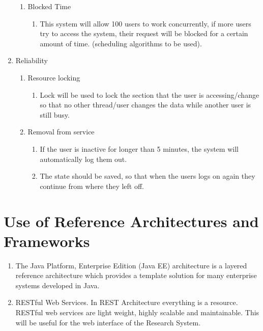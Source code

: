 \documentclass[hidelinks,a4paper,12pt]{article}
\begin{document}
\begin{enumerate}
\begin{enumerate}
		\item  Blocked Time
		\begin{enumerate}
			\item   This system will allow 100 users to work concurrently, if more users try to access the system, their request will be blocked for a certain amount of time.             (scheduling algorithms to be used).
		\end{enumerate}
	\end{enumerate}
	
	
	
	\item  Reliability
		\begin{enumerate}
			\item  Resource locking
				\begin{enumerate}
					\item  Lock will be used to lock the section that the user is accessing/change so that no other thread/user changes the data while another user is still busy.
				\end{enumerate}
			
			\item Removal from service
							\begin{enumerate}
								\item   If the user is inactive for longer than 5 minutes, the system will automatically log them out.
								\item The state should be saved, so that when the users logs on again they continue from where they left off.
							\end{enumerate}
		
		\end{enumerate}
\end{enumerate}

\section{Use of Reference Architectures and Frameworks}
\begin{enumerate}
	\item  The Java Platform, Enterprise Edition (Java EE) architecture is a layered reference architecture which provides a template solution for many enterprise systems developed in Java.
	\item  RESTful Web Services. In REST Architecture everything is a resource. RESTful web services are light weight, highly scalable and maintainable. This will be useful for the web interface of the Research System.
\end{enumerate}
		
\end{document}
